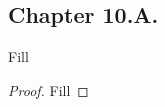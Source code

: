\subsection*{Chapter 10.A. }


\begin{exercise}{1}
  Fill
\end{exercise}
\begin{proof}
 Fill
\end{proof}